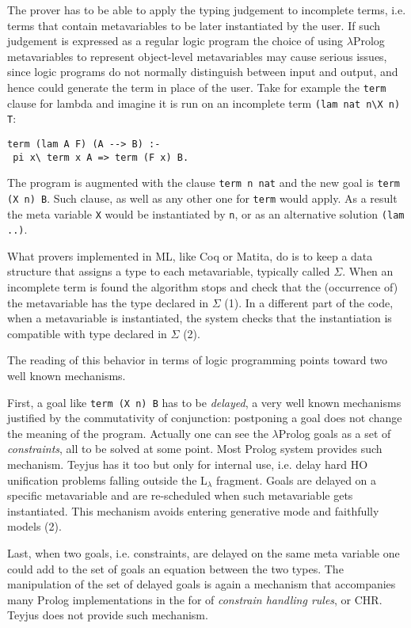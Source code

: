 \documentclass[preprint]{sigplanconf}
\begin{document}
The prover has to be able to apply the typing judgement to incomplete terms,
i.e. terms that contain metavariables to be later instantiated by the
user.  If such judgement is expressed as a regular logic program the choice
of using $\lambda$Prolog metavariables to represent object-level metavariables
may cause serious issues, since logic programs do not normally distinguish
between input and output, and hence could generate the term in place of the
user.  Take for example the \verb+term+ clause for lambda and imagine
it is run on an incomplete term \verb+(lam nat n\X n) T+:
{\small
\begin{verbatim}
term (lam A F) (A --> B) :-
 pi x\ term x A => term (F x) B.
\end{verbatim}
}
The program is augmented with the clause \verb+term n nat+ and the new goal is \verb+term (X n) B+.
Such clause, as well as any other one for \verb+term+ would apply.  As a result
the meta variable \verb+X+ would be instantiated by \verb+n+, or as an
alternative solution \verb+(lam ..)+.

What provers implemented in ML, like Coq or Matita, do is to keep
a data structure that assigns a type to each metavariable, typically called
$\Sigma$.  When an incomplete term is found the algorithm stops and check
that the (occurrence of) the metavariable has the type declared in $\Sigma$ (1).
In a different part of the code, when a metavariable is instantiated, the system
checks that the instantiation is compatible with type declared in $\Sigma$ (2).

The reading of this behavior in terms of logic programming points toward two
well known mechanisms.  

First, a goal like \verb+term (X n) B+ has to be
\emph{delayed}, a very well known mechanisms justified by the commutativity of
conjunction: postponing a goal does not change the meaning of the program.
Actually one can see the $\lambda$Prolog goals as a set of \emph{constraints},
all to be solved at some point.  Most Prolog system provides such mechanism.
Teyjus has it too but only for internal use, i.e. delay hard HO unification
problems falling outside the L$_\lambda$ fragment.  Goals are delayed on
a specific metavariable and are re-scheduled when such metavariable
gets instantiated.  This mechanism avoids entering generative mode and
faithfully models (2).

Last, when two goals, i.e. constraints, are delayed on the same meta variable
one could add to the set of goals an equation between the two types.  The
manipulation of the set of delayed goals is again a mechanism that accompanies
many Prolog implementations in the for of \emph{constrain handling rules},
or CHR.  Teyjus does not provide such mechanism.
\end{document}
